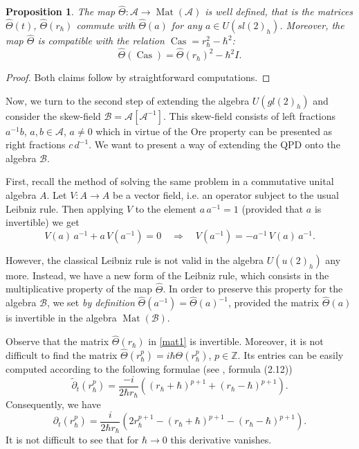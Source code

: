 \documentclass[11pt]{article}
\newcommand{\pa}{\partial}
\renewcommand{\AA}{\mathcal{A}}
\DeclareMathOperator{\Cas}{Cas}
\newcommand{\tpa}{\widetilde{\pa}}
\newcommand{\hh}{\hbar}
\newcommand{\hatt}{\widehat{\Theta}}
\DeclareMathOperator{\Mat}{Mat}
\newcommand{\rh}{r_{\hbar}}
\newcommand{\Ah}{\mathcal{B}}
\numberwithin{equation}{section}
\theoremstyle{plain}
\newtheorem{proposition}[theorem]{Proposition}
\theoremstyle{definition}
\begin{document}
\begin{proposition}
The map $\hatt: \AA\to {\Mat}(\AA)$ is well defined, that is the matrices  $\hatt(t)$, $\hatt(\rh)$ commute with $\hatt(a)$
for any $ a\in U(sl(2)_h)$. Moreover, the map $\hatt$ is compatible with the relation ${\Cas}=\rh^2-\hh^2$:
\begin{equation}
\hatt({\Cas})=\hatt({\rh})^2-\hh^2 {I}.
\label{ree}
\end{equation}
\end{proposition}

\begin{proof}
Both claims follow by straightforward computations.
\end{proof}

Now, we turn to the second step of extending the algebra $U(gl(2)_h)$ and consider the skew-field $\Ah=\AA[\AA^{-1}]$. This
skew-field consists of left fractions $a^{-1} b$, $a,b \in\AA$, $a\not=0$ which in virtue of the Ore property can be presented as
right fractions $c\,d^{-1}$. We want to present a way of extending the QPD onto the algebra $\Ah$.

First, recall the method of solving the same problem in a commutative unital algebra $A$.
Let  $V:A\to A$ be a vector field,  i.e. an operator  subject to the usual Leibniz rule.
Then applying $V$ to the element $a\,a^{-1}=1$ (provided that $a$ is invertible) we get
\[
V(a)\,a^{-1}+a\,V(a^{-1})=0\quad \Rightarrow\quad V(a^{-1})=- a^{-1}\, V(a)\, a^{-1}.
\]

However, the classical Leibniz rule is not valid in the algebra $U(u(2)_h)$ any more. Instead, we have a new form of the Leibniz rule,
which consists in the multiplicative property of the map $\hatt$. In order to preserve this property for the algebra $\Ah$, we set
\emph{by definition} $\hatt(a^{-1})=\hatt(a)^{-1}$, provided the matrix $\hatt(a)$ is invertible in the algebra ${\Mat}(\Ah)$.


Observe that the matrix $\hatt(\rh)$ in \eqref{mat1} is invertible. Moreover, it is not difficult to find the matrix $\hatt(\rh^p)=i\hh \Theta(\rh^p)$,
$p\in \mathbb{Z}$. Its entries can be easily computed according to the following formulae (see  \cite{GS2}, formula (2.12))
\begin{equation}
\tpa_t(\rh^p)=\frac{-i}{2\hh\rh}((\rh+\hh)^{p+1}+(\rh-\hh)^{p+1}).
\label{pp}
\end{equation}
Consequently, we have
\begin{equation}
\pa_t(\rh^p)=\frac{i}{2\hh\rh}(2\rh^{p+1}-(\rh+\hh)^{p+1}-(\rh-\hh)^{p+1}).
\label{pppp}
\end{equation}
It is not difficult to see that for $\hh\to 0$ this derivative vanishes.
\end{document}
